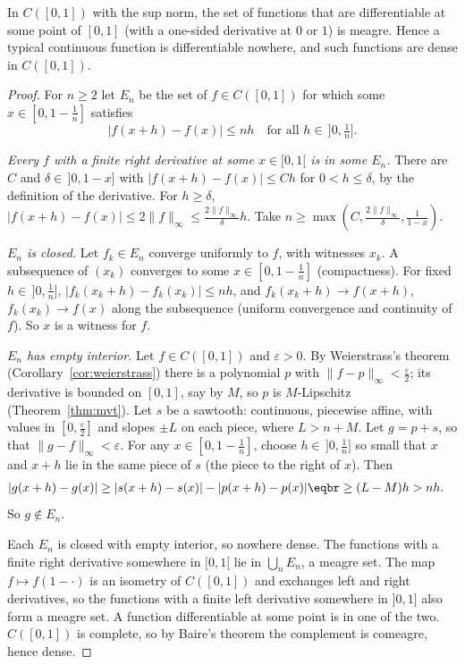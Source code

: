 \begin{theorem}\label{thm:banachmaz}
In $C([0,1])$ with the sup norm, the set of functions that are differentiable at some point of $[0,1]$ (with a one-sided derivative at $0$ or $1$) is
meagre. Hence a typical continuous function is differentiable nowhere, and such functions are dense in $C([0,1])$.
\end{theorem}
\begin{proof}
For $n\ge2$ let $E_n$ be the set of $f\in C([0,1])$ for which some $x\in[0,1-\frac1n]$ satisfies
\[|f(x+h)-f(x)|\le nh\quad\text{for all }h\in\,]0,\tfrac1n].\]

\emph{Every $f$ with a finite right derivative at some $x\in[0,1[$ is in some $E_n$.} There are $C$ and $\delta\in\,]0,1-x]$ with $|f(x+h)-f(x)|\le Ch$ for $0<h\le\delta$, by the definition of the
derivative. For $h\ge\delta$, $|f(x+h)-f(x)|\le2\|f\|_\infty\le\frac{2\|f\|_\infty}\delta h$. Take $n\ge\max(C,\frac{2\|f\|_\infty}\delta,\frac1{1-x})$.

\emph{$E_n$ is closed.} Let $f_k\in E_n$ converge uniformly to $f$, with witnesses $x_k$. A subsequence of $(x_k)$ converges to some $x\in[0,1-\frac1n]$ (compactness). For fixed
$h\in\,]0,\frac1n]$, $|f_k(x_k+h)-f_k(x_k)|\le nh$, and $f_k(x_k+h)\to f(x+h)$, $f_k(x_k)\to f(x)$ along the subsequence (uniform convergence and continuity of $f$). So $x$ is a witness for $f$.

\emph{$E_n$ has empty interior.} Let $f\in C([0,1])$ and $\varepsilon>0$. By Weierstrass's theorem (Corollary~\ref{cor:weierstrass}) there is a polynomial $p$ with $\|f-p\|_\infty<\frac\varepsilon2$; its
derivative is bounded on $[0,1]$, say by $M$, so $p$ is $M$-Lipschitz (Theorem~\ref{thm:mvt}). Let $s$ be a sawtooth: continuous, piecewise affine, with values in $[0,\frac\varepsilon2]$
and slopes $\pm L$ on each piece, where $L>n+M$. Let $g=p+s$, so that $\|g-f\|_\infty<\varepsilon$. For any $x\in[0,1-\frac1n]$, choose $h\in\,]0,\frac1n]$ so small that $x$ and $x+h$ lie in the same piece
of $s$ (the piece to the right of $x$). Then
\[\begin{aligned}|g(x+h)-g(x)|&\ge|s(x+h)-s(x)|-|p(x+h)-p(x)|\eqbr\ge(L-M)h>nh.\end{aligned}\]
So $g\notin E_n$.

Each $E_n$ is closed with empty interior, so nowhere dense. The functions with a finite right derivative somewhere in $[0,1[$ lie in $\bigcup_nE_n$, a meagre set.
The map $f\mapsto f(1-\cdot)$ is an isometry of $C([0,1])$ and exchanges left and right derivatives, so the functions with a finite left derivative somewhere in $]0,1]$ also
form a meagre set. A function differentiable at some point is in one of the two. $C([0,1])$ is complete, so by Baire's theorem the complement
is comeagre, hence dense.
\end{proof}

